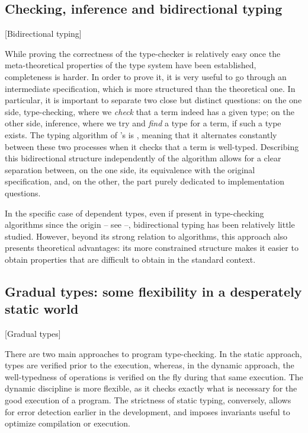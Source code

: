 \subsection{Checking, inference and bidirectional typing}[Bidirectional typing]

While proving the correctness of the type-checker is relatively easy once the
meta-theoretical properties of the type system have been established, completeness is harder.
In order to prove it, it is very useful to go through an intermediate specification,
which is more structured than the theoretical one.
In particular, it is important to separate two close but distinct questions:
on the one side, type-checking, where we \emph{check} that a term indeed has a
given type;
on the other side, inference, where we try and \emph{find} a type for a term, if such a
type exists.
The typing algorithm of 's  is , meaning that it
alternates constantly between these two processes when it checks that a term is well-typed.
Describing this bidirectional structure independently of the algorithm allows for a
clear separation between, on the one side, its equivalence with the original specification,
and, on the other, the part purely dedicated to implementation questions.

In the specific case of dependent types, even if present in type-checking algorithms since
the origin – see \eg {} –, bidirectional typing has been relatively little
studied. However, beyond its strong relation to algorithms, this approach also presents
theoretical advantages: its more constrained structure makes it easier
to obtain properties that are difficult to obtain in the standard context.

\subsection{Gradual types: some flexibility in a desperately static world}
  [Gradual types]
\label{sec:intro-graduel-en}

There are two main approaches to program type-checking. In the static approach,%
types are verified prior to the execution, whereas, in the dynamic approach, the well-typedness
of operations is verified on the fly during that same execution.
The dynamic discipline is more flexible, as it checks exactly what is necessary
for the good execution of a program.
The strictness of static typing, conversely, allows for error detection earlier in the
development, and imposes invariants useful to optimize compilation or execution.

